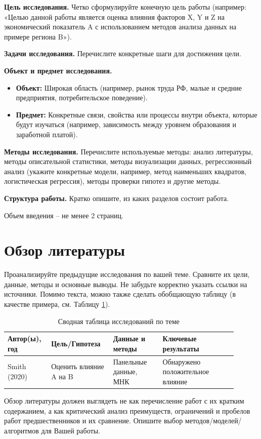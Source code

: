 \documentclass[a4paper,12pt]{article}
\begin{document}
\textbf{Цель исследования.} Четко сформулируйте конечную цель работы (например: «Целью данной работы является оценка влияния факторов X, Y и Z на экономический показатель A с использованием методов анализа данных на примере региона B»).

\textbf{Задачи исследования.} Перечислите конкретные шаги для достижения цели.

\textbf{Объект и предмет исследования.}
\begin{itemize}
    \item \textbf{Объект:} Широкая область (например, рынок труда РФ, малые и средние предприятия, потребительское поведение).
    \item \textbf{Предмет:} Конкретные связи, свойства или процессы внутри объекта, которые будут изучаться (например, зависимость между уровнем образования и заработной платой).
\end{itemize}

\textbf{Методы исследования.} Перечислите используемые методы: анализ литературы, методы описательной статистики, методы визуализации данных, регрессионный анализ (укажите конкретные модели, например, метод наименьших квадратов, логистическая регрессия), методы проверки гипотез и другие методы.

\textbf{Структура работы.} Кратко опишите, из каких разделов состоит работа.

Объем введения -- не менее 2 страниц.


\newpage

\section{Обзор литературы}
\label{sec:literature}




Проанализируйте предыдущие исследования по вашей теме. Сравните их цели, данные, методы и основные выводы. Не забудьте корректно указать ссылки на источники. Помимо текста, можно также сделать обобщающую таблицу (в качестве примера, см. Таблицу \ref{tab:literature}).
\begin{table}[H]
    \centering
    \caption{Сводная таблица исследований по теме}
    \label{tab:literature}
    \begin{tabular}{p{0.15\linewidth}p{0.25\linewidth}p{0.2\linewidth}p{0.3\linewidth}}
        \toprule
        \textbf{Автор(ы), год}        & \textbf{Цель/Гипотеза} & \textbf{Данные и методы} & \textbf{Ключевые результаты}     \\
        \midrule
        Smith (2020) \cite{smith2020} & Оценить влияние A на B & Панельные данные, МНК    & Обнаружено положительное влияние \\
        \bottomrule
    \end{tabular}
\end{table}
Обзор литературы должен выглядеть не как перечисление работ с их кратким содержанием, а как критический анализ преимуществ, ограничений и пробелов работ предшественников и их сравнение. Опишите выбор методов/моделей/алгоритмов для Вашей работы.
\end{document}
